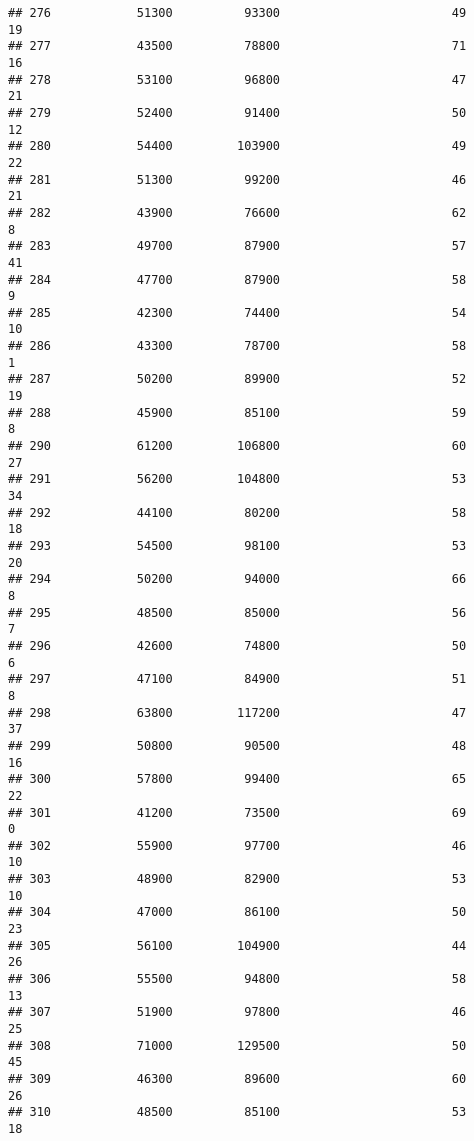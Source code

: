 \documentclass[
]{article}
\begin{document}
\begin{verbatim}
## 276            51300          93300                        49           19
## 277            43500          78800                        71           16
## 278            53100          96800                        47           21
## 279            52400          91400                        50           12
## 280            54400         103900                        49           22
## 281            51300          99200                        46           21
## 282            43900          76600                        62            8
## 283            49700          87900                        57           41
## 284            47700          87900                        58            9
## 285            42300          74400                        54           10
## 286            43300          78700                        58            1
## 287            50200          89900                        52           19
## 288            45900          85100                        59            8
## 290            61200         106800                        60           27
## 291            56200         104800                        53           34
## 292            44100          80200                        58           18
## 293            54500          98100                        53           20
## 294            50200          94000                        66            8
## 295            48500          85000                        56            7
## 296            42600          74800                        50            6
## 297            47100          84900                        51            8
## 298            63800         117200                        47           37
## 299            50800          90500                        48           16
## 300            57800          99400                        65           22
## 301            41200          73500                        69            0
## 302            55900          97700                        46           10
## 303            48900          82900                        53           10
## 304            47000          86100                        50           23
## 305            56100         104900                        44           26
## 306            55500          94800                        58           13
## 307            51900          97800                        46           25
## 308            71000         129500                        50           45
## 309            46300          89600                        60           26
## 310            48500          85100                        53           18

\end{verbatim}
\end{document}
